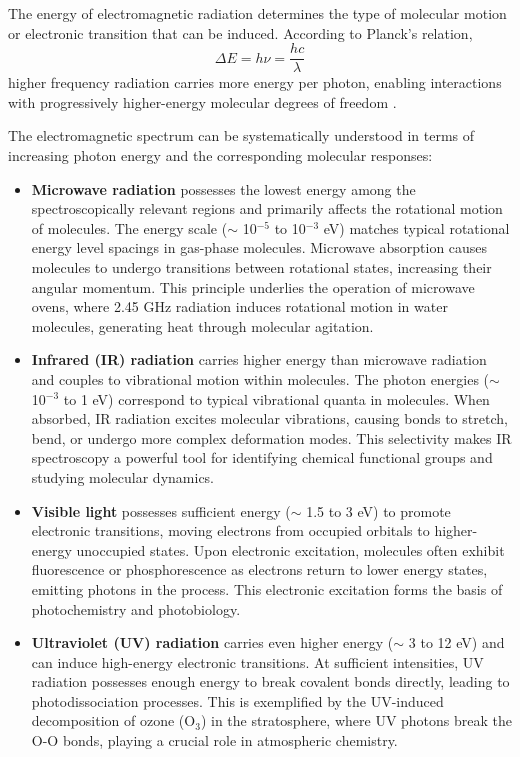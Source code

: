 \noindent The energy of electromagnetic radiation determines the type of molecular motion or electronic transition that can be induced. According to Planck's relation,
\begin{equation}
    \Delta E = h\nu = \frac{hc}{\lambda}
    \label{eq:planck_energy_frequency}
\end{equation}
higher frequency radiation carries more energy per photon, enabling interactions with progressively higher-energy molecular degrees of freedom \cite{Boyd2008Chapter1Nonlinear, Mukamel1995PrinciplesNonlinearOptical}.

\noindent The electromagnetic spectrum can be systematically understood in terms of increasing photon energy and the corresponding molecular responses:

\begin{itemize}
    \item \textbf{Microwave radiation} possesses the lowest energy among the spectroscopically relevant regions and primarily affects the rotational motion of molecules. The energy scale ($\sim$ 10$^{-5}$ to 10$^{-3}$ eV) matches typical rotational energy level spacings in gas-phase molecules. Microwave absorption causes molecules to undergo transitions between rotational states, increasing their angular momentum. This principle underlies the operation of microwave ovens, where 2.45 GHz radiation induces rotational motion in water molecules, generating heat through molecular agitation.

    \item \textbf{Infrared (IR) radiation} carries higher energy than microwave radiation and couples to vibrational motion within molecules. The photon energies ($\sim$ 10$^{-3}$ to 1 eV) correspond to typical vibrational quanta in molecules. When absorbed, IR radiation excites molecular vibrations, causing bonds to stretch, bend, or undergo more complex deformation modes. This selectivity makes IR spectroscopy a powerful tool for identifying chemical functional groups and studying molecular dynamics.

    \item \textbf{Visible light} possesses sufficient energy ($\sim$ 1.5 to 3 eV) to promote electronic transitions, moving electrons from occupied orbitals to higher-energy unoccupied states. Upon electronic excitation, molecules often exhibit fluorescence or phosphorescence as electrons return to lower energy states, emitting photons in the process. This electronic excitation forms the basis of photochemistry and photobiology.

    \item \textbf{Ultraviolet (UV) radiation} carries even higher energy ($\sim$ 3 to 12 eV) and can induce high-energy electronic transitions. At sufficient intensities, UV radiation possesses enough energy to break covalent bonds directly, leading to photodissociation processes. This is exemplified by the UV-induced decomposition of ozone (O$_3$) in the stratosphere, where UV photons break the O-O bonds, playing a crucial role in atmospheric chemistry.
\end{itemize}

